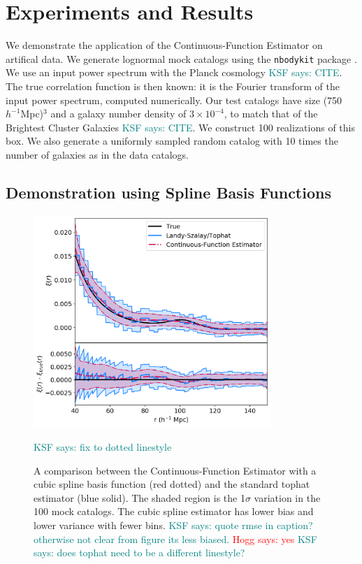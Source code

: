 \documentclass[modern]{aastex62}
\newcommand{\est}{the Continuous-Function Estimator\xspace}
\newcommand{\hmpc}{$h^{-1}$Mpc}
\newcommand{\KSF}[1]{\textcolor{teal}{KSF says: #1}}
\newcommand{\hogg}[1]{\textcolor{red}{Hogg says: #1}}
\begin{document}
\section{Experiments and Results}
\label{sec:app}

We demonstrate the application of \est on artifical data.
We generate lognormal mock catalogs \citep{ColesJones1991} using the \texttt{nbodykit} package \citep{Hand2018}.
We use an input power spectrum with the Planck cosmology \KSF{CITE}.
The true correlation function is then known: it is the Fourier transform of the input power spectrum, computed numerically.
Our test catalogs have size (750 \hmpc)$^3$ and a galaxy number density of $3 \times 10^{-4}$, to match that of the Brightest Cluster Galaxies \KSF{CITE}.
We construct 100 realizations of this box. 
We also generate a uniformly sampled random catalog with 10 times the number of galaxies as in the data catalogs.

\subsection{Demonstration using Spline Basis Functions}
\label{sec:spline}

\label{fig:spline}
\begin{figure}[ht]
\centering
    \includegraphics[width=0.8\textwidth]{tophat_cubic}
    \caption{A comparison between \est with a cubic spline basis function (red dotted) and the standard tophat estimator (blue solid). The shaded region is the 1$\sigma$ variation in the 100 mock catalogs. The cubic spline estimator has lower bias and lower variance with fewer bins. \KSF{quote rmse in caption? otherwise not clear from figure its less biased.} \hogg{yes} \KSF{does tophat need to be a different linestyle?}} \KSF{fix to dotted linestyle}

\end{figure}
\end{document}
